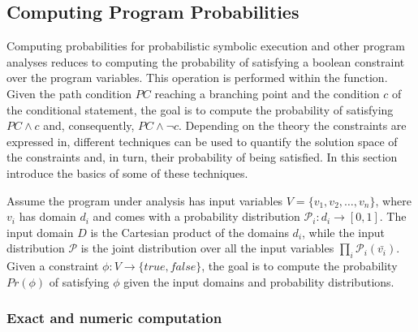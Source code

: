 \subsection{Computing Program Probabilities}
\label{sec:computingprobabilities}

Computing probabilities for probabilistic symbolic execution and other program analyses reduces to computing the probability of satisfying a boolean constraint over the program variables. This operation is performed within the  function. Given the path condition $PC$ reaching a branching point and the condition $c$ of the conditional statement, the goal is to compute the probability of satisfying $PC \land c$ and, consequently, $PC \land \neg c$. Depending on the theory the constraints are expressed in, different techniques can be used to quantify the solution space of the constraints and, in turn, their probability of being satisfied. In this section introduce the basics of some of these techniques.

Assume the program under analysis has input variables $V=\{v_1, v_2, \dots, v_n\}$, where $v_i$ has domain $d_i$ and comes with a probability distribution $\mathcal{P}_i: d_i \to [0, 1]$. The input domain $D$ is the Cartesian product of the domains $d_i$, while the input distribution $\mathcal{P}$ is the joint distribution over all the input variables $\prod_i \mathcal{P}_i(\bar{v_i})$. Given a constraint $\phi: V \to \{true, false\}$, the goal is to compute the probability $Pr(\phi)$ of satisfying $\phi$ given the input domains and probability distributions. 

\subsubsection{Exact and numeric computation}\label{sec:computingprobabilitiesExact}

